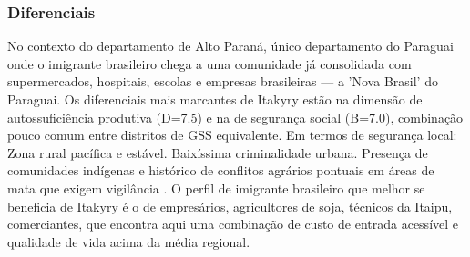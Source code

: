 \subsubsection*{Diferenciais}\label{dif-itakyry-1006}
No contexto do departamento de Alto Paraná, único departamento do Paraguai onde o imigrante brasileiro chega a uma comunidade já consolidada com supermercados, hospitais, escolas e empresas brasileiras — a 'Nova Brasil' do Paraguai. Os diferenciais mais marcantes de Itakyry estão na dimensão de autossuficiência produtiva (D=7.5) e na de segurança social (B=7.0), combinação pouco comum entre distritos de GSS equivalente. Em termos de segurança local: Zona rural pacífica e estável. Baixíssima criminalidade urbana. Presença de comunidades indígenas e histórico de conflitos agrários pontuais em áreas de mata que exigem vigilância . O perfil de imigrante brasileiro que melhor se beneficia de Itakyry é o de empresários, agricultores de soja, técnicos da Itaipu, comerciantes, que encontra aqui uma combinação de custo de entrada acessível e qualidade de vida acima da média regional.
